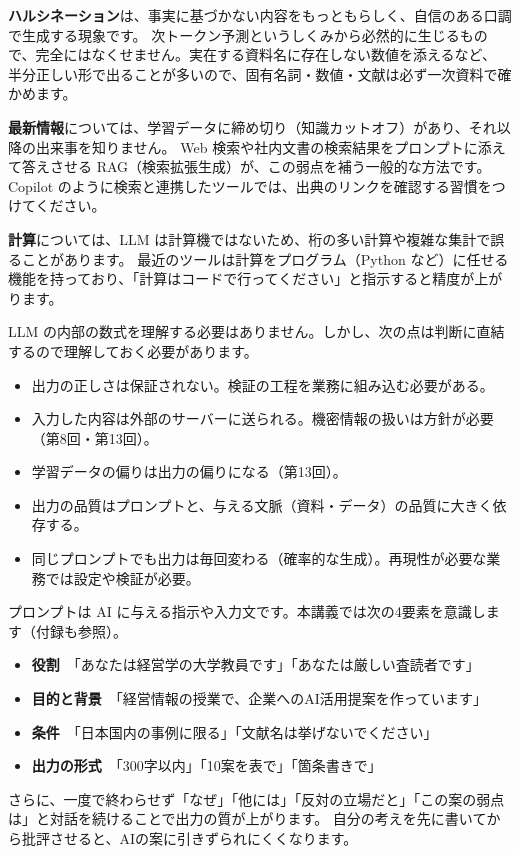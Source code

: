 \textbf{ハルシネーション}は、事実に基づかない内容をもっともらしく、自信のある口調で生成する現象です。
次トークン予測というしくみから必然的に生じるもので、完全にはなくせません。実在する資料名に存在しない数値を添えるなど、
半分正しい形で出ることが多いので、固有名詞・数値・文献は必ず一次資料で確かめます。

\textbf{最新情報}については、学習データに締め切り（知識カットオフ）があり、それ以降の出来事を知りません。
Web 検索や社内文書の検索結果をプロンプトに添えて答えさせる RAG（検索拡張生成）が、この弱点を補う一般的な方法です。
Copilot のように検索と連携したツールでは、出典のリンクを確認する習慣をつけてください。

\textbf{計算}については、LLM は計算機ではないため、桁の多い計算や複雑な集計で誤ることがあります。
最近のツールは計算をプログラム（Python など）に任せる機能を持っており、「計算はコードで行ってください」と指示すると精度が上がります。

LLM の内部の数式を理解する必要はありません。しかし、次の点は判断に直結するので理解しておく必要があります。
\begin{itemize}
  \item 出力の正しさは保証されない。検証の工程を業務に組み込む必要がある。
  \item 入力した内容は外部のサーバーに送られる。機密情報の扱いは方針が必要（第8回・第13回）。
  \item 学習データの偏りは出力の偏りになる（第13回）。
  \item 出力の品質はプロンプトと、与える文脈（資料・データ）の品質に大きく依存する。
  \item 同じプロンプトでも出力は毎回変わる（確率的な生成）。再現性が必要な業務では設定や検証が必要。
\end{itemize}

プロンプトは AI に与える指示や入力文です。本講義では次の4要素を意識します（付録も参照）。
\begin{itemize}
  \item \textbf{役割}　「あなたは経営学の大学教員です」「あなたは厳しい査読者です」
  \item \textbf{目的と背景}　「経営情報の授業で、企業へのAI活用提案を作っています」
  \item \textbf{条件}　「日本国内の事例に限る」「文献名は挙げないでください」
  \item \textbf{出力の形式}　「300字以内」「10案を表で」「箇条書きで」
\end{itemize}
さらに、一度で終わらせず「なぜ」「他には」「反対の立場だと」「この案の弱点は」と対話を続けることで出力の質が上がります。
自分の考えを先に書いてから批評させると、AIの案に引きずられにくくなります。

